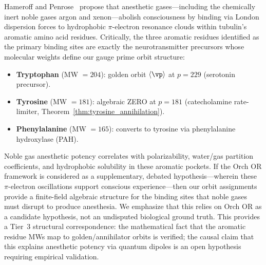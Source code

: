 \begin{remark}
Hameroff and Penrose~\cite{hameroff2014} propose that anesthetic gases---including the chemically inert noble gases argon and xenon---abolish consciousness by binding via London dispersion forces to hydrophobic $\pi$-electron resonance clouds within tubulin's aromatic amino acid residues. Critically, the three aromatic residues identified as the primary binding sites are exactly the neurotransmitter precursors whose molecular weights define our gauge prime orbit structure:
\begin{itemize}[noitemsep]
  \item \textbf{Tryptophan} (MW $= 204$): golden orbit $\langle\vp\rangle$ at $p = 229$ (serotonin precursor).
  \item \textbf{Tyrosine} (MW $= 181$): algebraic ZERO at $p = 181$ (catecholamine rate-limiter, Theorem~\ref{thm:tyrosine_annihilation}).
  \item \textbf{Phenylalanine} (MW $= 165$): converts to tyrosine via phenylalanine hydroxylase (PAH).
\end{itemize}
Noble gas anesthetic potency correlates with polarizability, water/gas partition coefficients, and hydrophobic solubility in these aromatic pockets. If the Orch OR framework is considered as a supplementary, debated hypothesis---wherein these $\pi$-electron oscillations support conscious experience---then our orbit assignments provide a finite-field algebraic structure for the binding sites that noble gases must disrupt to produce anesthesia. We emphasize that this relies on Orch OR as a candidate hypothesis, not an undisputed biological ground truth. This provides a Tier~3 structural correspondence: the mathematical fact that the aromatic residue MWs map to golden/annihilator orbits is verified; the causal claim that this explains anesthetic potency via quantum dipoles is an open hypothesis requiring empirical validation.
\end{remark}

